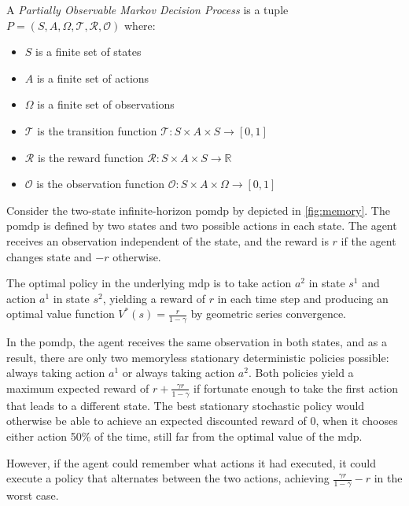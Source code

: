 \begin{definition}
A \textit{Partially Observable Markov Decision Process} is a tuple $P = (S, A,\Omega, \mathcal{T}, \mathcal{R}, \mathcal{O})$ where:
\begin{itemize}
    \setlength\itemsep{0.01em}
    \item $S$ is a finite set of states
    \item $A$ is a finite set of actions
    \item $\Omega$ is a finite set of observations
    \item $\mathcal{T}$ is the transition function $\mathcal{T} : S \times A \times S \rightarrow [0,1]$
    \item $\mathcal{R}$ is the reward function $\mathcal{R} : S \times A \times S \rightarrow \mathbb{R}$
    \item $\mathcal{O}$ is the observation function $\mathcal{O} : S \times A \times \Omega \rightarrow [0,1]$
\end{itemize}
\end{definition}

\begin{example}    
    Consider the two-state infinite-horizon \gls{pomdp} by \cite{NIPS1994_1c1d4df5} depicted in \ref{fig:memory}. The \gls{pomdp} is 
    defined by two states and two possible actions in each state. The agent receives an observation 
    independent of the state, and the reward is $r$ if the agent changes state and $-r$ otherwise.

    The optimal policy in the underlying \gls{mdp} is to take action $a^2$ in state $s^1$ and 
    action $a^1$ in state $s^2$, yielding a reward of $r$ in each time step and producing an 
    optimal value function $V^*(s)=\frac{r}{1-\gamma}$ by geometric series convergence. 
    
    In the \gls{pomdp}, the agent receives the same observation in both states, and 
    as a result, there are only two memoryless stationary deterministic policies possible: always taking action $a^1$ or always taking action $a^2$.
    Both policies yield a maximum expected reward of $r+\frac{\gamma r}{1-\gamma}$ if fortunate enough to take 
    the first action that leads to a different state. The best stationary stochastic policy would otherwise 
    be able to achieve an expected discounted reward of 0, when it chooses either action 50\% of the time, still 
    far from the optimal value of the \gls{mdp}.

    However, if the agent could remember what actions it had executed, it could execute a policy that 
    alternates between the two actions, achieving  $\frac{\gamma r}{1-\gamma}-r$ in the worst case.
\end{example}

